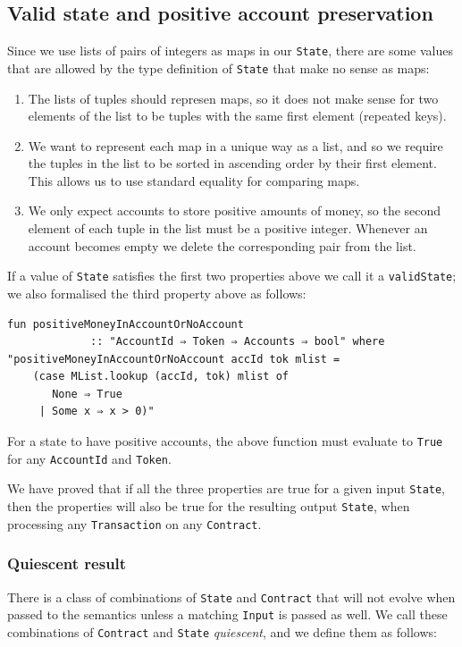 \documentclass[runningheads]{llncs}
\begin{document}
\subsection{Valid state and positive account preservation}

Since we use lists of pairs of integers as maps in our \texttt{State}, there are some values that are allowed by the type definition of \texttt{State} that make no sense as maps:

\begin{enumerate}
    \item The lists of tuples should represen maps, so it does not make sense for two elements of the list to be tuples with the same first element (repeated keys).
    \item We want to represent each map in a unique way as a list, and so we require the tuples in the list to be sorted in ascending order by their first element. This allows us to use standard equality for comparing maps.
    \item We only expect accounts to store positive amounts of money, so the second element of each tuple in the list must be a positive integer. Whenever an account becomes empty we  delete the corresponding pair  from the list.
\end{enumerate}
\noindent
If a value of \texttt{State} satisfies the first two properties above we call it a \texttt{validState}; we also formalised the third property above as follows:

\begin{verbatim}
fun positiveMoneyInAccountOrNoAccount
             :: "AccountId ⇒ Token ⇒ Accounts ⇒ bool" where
"positiveMoneyInAccountOrNoAccount accId tok mlist =
    (case MList.lookup (accId, tok) mlist of
       None ⇒ True
     | Some x ⇒ x > 0)"
\end{verbatim}
\noindent
For a state to have positive accounts, the above function must evaluate to \texttt{True} for any \texttt{AccountId} and \texttt{Token}.

We have proved that if all the three properties are true for a given input \texttt{State}, then the properties will also be true for the resulting output \texttt{State}, when processing any \texttt{Transaction} on any \texttt{Contract}.

\subsubsection{Quiescent result}

There is a class of combinations of \texttt{State} and \texttt{Contract} that will not evolve when passed to the semantics unless a matching \texttt{Input} is passed as well. We call these combinations of \texttt{Contract} and \texttt{State} \textit{quiescent}, and we define them as follows:
\end{document}
